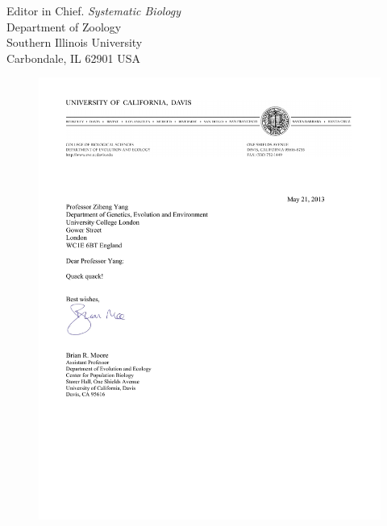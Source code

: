 \documentclass[10pt]{letter}
\begin{document}

\begin{letter}{Editor in Chief. \emph{Systematic Biology} \\
Department of Zoology \\
Southern Illinois University \\
Carbondale, IL 62901 USA} 


\begin{flushleft}
\begin{figure}
\includegraphics[width=6.5in]{eve_letterhead.pdf}
\end{figure}
\end{flushleft} 


\end{letter}
\end{document}
